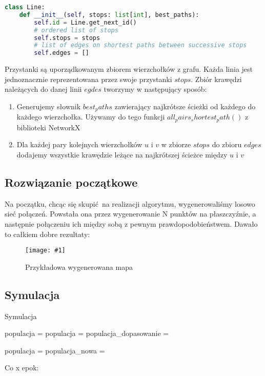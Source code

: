 \documentclass[12pt,a4paper]{article}
\newcommand{\imgcustomsize}[3]{
	\begin{figure}[H]
		\centering
		\texttt{[image: \#1]}
		\caption{#2}
	\end{figure}
}
\newcommand{\img}[2]{\imgcustomsize{#1}{#2}{0.8}}
\begin{document}
\begin{lstlisting}[language=Python]
class Line:
    def __init__(self, stops: list[int], best_paths):
        self.id = Line.get_next_id()
        # ordered list of stops
        self.stops = stops
        # list of edges on shortest paths between successive stops
        self.edges = []
\end{lstlisting}

Przystanki są uporządkowanym zbiorem wierzchołków z grafu. Każda linia jest jednoznacznie reprezentowana przez swoje przystanki $stops$.
Zbiór krawędzi należących do danej linii $egdes$ tworzymy w następujący sposób:
\begin{enumerate}
    \item Generujemy słownik $best_paths$ zawierający najkrótsze ścieżki od każdego do każdego wierzchołka. Używamy do tego funkcji $all_pairs_shortest_path()$ z biblioteki NetworkX
    \item Dla każdej pary kolejnych wierzchołków $u$ i $v$ w zbiorze $stops$ do zbioru $edges$ dodajemy wszystkie krawędzie leżące na najkrótszej ścieżce między $u$ i $v$
\end{enumerate}

\subsection{Rozwiązanie początkowe}
Na początku, chcąc się skupić na realizacji algorytmu, wygenerowaliśmy losowo sieć połączeń. Powstała ona przez wygenerowanie N punktów na płaszczyźnie, a następnie połączeniu ich między sobą z pewnym prawdopodobieństwem. Dawało to całkiem dobre rezultaty:
\img{map_seed_46}{Przykładowa wygenerowana mapa}

\subsection{Symulacja}
\begin{algorithm}[H]
    \caption{Symulacja}
    \begin{algorithmic}[1]
        \State populacja = 
        \State {}
        \State populacja = 
        \State populacja\_dopasowanie = 

        \State populacja = 
        \State populacja\_nowa =  

        Co x epok:
        \State {}
        \EndFor
        \EndFunction
    \end{algorithmic}
\end{algorithm}
\end{document}
